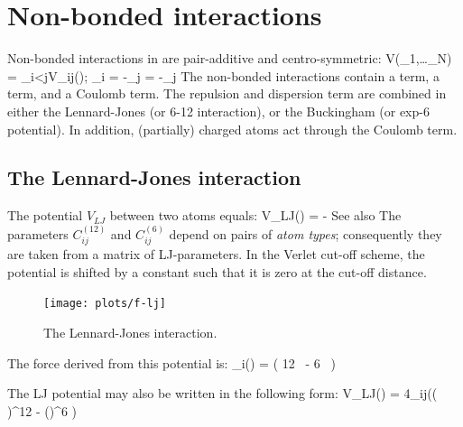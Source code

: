 \section{Non-bonded interactions}
Non-bonded interactions in {\gromacs} are pair-additive and centro-symmetric:
\beq
V(_1,\ldots {}_N) = \sum_{i<j}V_{ij}(\rvij);
\eeq
\beq
{}_i = -\sum_j   = -_j
\eeq
The non-bonded interactions contain a  term, 
a 
term, and a Coulomb term. The repulsion and dispersion term are
combined in either the Lennard-Jones (or 6-12 interaction), or the
Buckingham (or exp-6 potential). In addition, (partially) charged atoms
act through the Coulomb term. 

\subsection{The Lennard-Jones interaction}
\label{sec:lj}
The  potential $V_{LJ}$ between two atoms equals:
\beq
V_{LJ}(\rij) =   -
\eeq
See also 
The parameters $C^{(12)}_{ij}$ and $C^{(6)}_{ij}$  depend on pairs of
{\em atom types}; consequently they are taken from a matrix of
LJ-parameters. In the Verlet cut-off scheme, the potential is shifted
by a constant such that it is zero at the cut-off distance.

\begin{figure}
\centerline{\texttt{[image: plots/f-lj]}}
\caption {The Lennard-Jones interaction.}
\label{fig:lj}
\end{figure}
 
The force derived from this potential is:
\beq
{}_i(\rvij) = \left( 12~ -
                                 6~ \right) \rnorm 
\eeq

The LJ potential may also be written in the following form:
\beq
V_{LJ}(\rvij) = 4\epsilon_{ij}\left(\left( {\rij}\right)^{12}
                - \left(\right)^{6} \right)
\label{eqn:sigeps}      
\eeq

